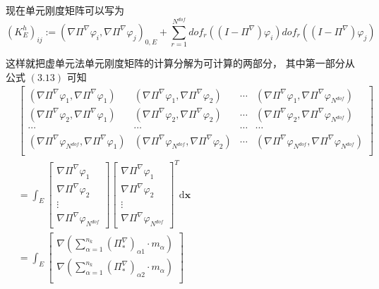 现在单元刚度矩阵可以写为 \\
\begin{equation}
(K_{E}^h)_{ij} := (\nabla \Pi^{\nabla}\varphi_i, \nabla \Pi^{\nabla}\varphi_j)_{0,E} + \sum_{r = 1}^{N^{dof}} dof_r((I-\Pi^{\nabla})\varphi_i) dof_r((I-\Pi^{\nabla})\varphi_j)
\end{equation}

这样就把虚单元法单元刚度矩阵的计算分解为可计算的两部分， 其中第一部分从公式 $(3.13)$ 可知 \\
\begin{equation}
\begin{aligned}
&\begin{bmatrix}
(\nabla\Pi^\nabla\varphi_1, \nabla\Pi^\nabla\varphi_1) & (\nabla\Pi^\nabla\varphi_1, \nabla\Pi^\nabla\varphi_2) & \cdots & (\nabla\Pi^\nabla\varphi_1, \nabla\Pi^\nabla\varphi_{N^{dof}})\\
(\nabla\Pi^\nabla\varphi_2, \nabla\Pi^\nabla\varphi_1) & (\nabla\Pi^\nabla\varphi_2, \nabla\Pi^\nabla\varphi_2) & \cdots & (\nabla\Pi^\nabla\varphi_2, \nabla\Pi^\nabla\varphi_{N^{dof}})\\
\cdots & \cdots & \cdots & \cdots \\
(\nabla\Pi^\nabla\varphi_{N^{dof}}, \nabla\Pi^\nabla\varphi_1) & (\nabla\Pi^\nabla\varphi_{N^{dof}}, \nabla\Pi^\nabla\varphi_2) & \cdots & (\nabla\Pi^\nabla\varphi_{N^{dof}}, \nabla\Pi^\nabla\varphi_{N^{dof}})\\
\end{bmatrix}\\
& = \int_E \begin{bmatrix} 
\nabla\Pi^\nabla\varphi_1\\ 
\nabla\Pi^\nabla\varphi_2 \\ 
\vdots\\
\nabla\Pi^\nabla\varphi_{N^{dof}}
\end{bmatrix}\begin{bmatrix} 
\nabla\Pi^\nabla\varphi_1\\ 
\nabla\Pi^\nabla\varphi_2 \\ 
\vdots\\
\nabla\Pi^\nabla\varphi_{N^{dof}}
\end{bmatrix}^T\mathrm d \mathbf x\\
& = \int_E \begin{bmatrix} 
\nabla(\sum_{\alpha = 1}^{n_k}(\Pi_{*}^{\nabla})_{\alpha 1}\cdot m_{\alpha})\\ 
\nabla(\sum_{\alpha = 1}^{n_k}(\Pi_{*}^{\nabla})_{\alpha 2}\cdot m_{\alpha}) \\ 

\end{bmatrix}
\end{aligned}
\end{equation}
